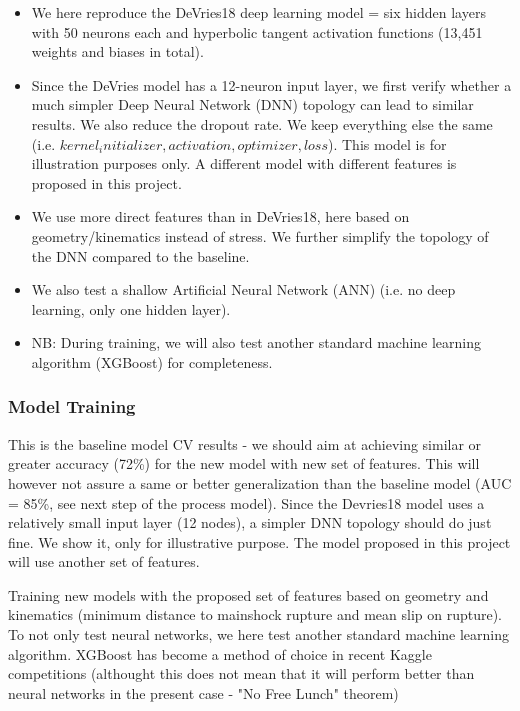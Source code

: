 \documentclass[journal,transmag]{IEEEtran}
\begin{document}
\begin{itemize}
  \item \par We here reproduce the DeVries18 deep learning model = six hidden layers with 50 neurons each and hyperbolic tangent activation functions (13,451 weights and biases in total).
  \item \par Since the DeVries model has a 12-neuron input layer, we first verify whether a much simpler Deep Neural Network (DNN) topology can lead to similar results. We also reduce the dropout rate. We keep everything else the same (i.e. $kernel_initializer, activation, optimizer, loss$). This model is for illustration purposes only. A different model with different features is proposed in this project.
  \item \par We use more direct features than in DeVries18, here based on geometry/kinematics instead of stress. We further simplify the topology of the DNN compared to the baseline.
  \item \par We also test a shallow Artificial Neural Network (ANN) (i.e. no deep learning, only one hidden layer).
  \item \par NB: During training, we will also test another standard machine learning algorithm (XGBoost) for completeness.
\end{itemize}

\vspace{0.5em}
\subsubsection{Model Training}
\vspace{0.5em}

This is the baseline model CV results - we should aim at achieving similar or greater accuracy (72\%) for the new model with new set of features.
This will however not assure a same or better generalization than the baseline model (AUC = 85\%, see next step of the process model).
Since the Devries18 model uses a relatively small input layer (12 nodes), a simpler DNN topology should do just fine. We show it, only for illustrative purpose. The model proposed in this project will use another set of features.

Training new models with the proposed set of features based on geometry and kinematics (minimum distance to mainshock rupture and mean slip on rupture).
To not only test neural networks, we here test another standard machine learning algorithm. XGBoost has become a method of choice in recent Kaggle competitions (althought this does not mean that it will perform better than neural networks in the present case - "No Free Lunch" theorem)
\end{document}
